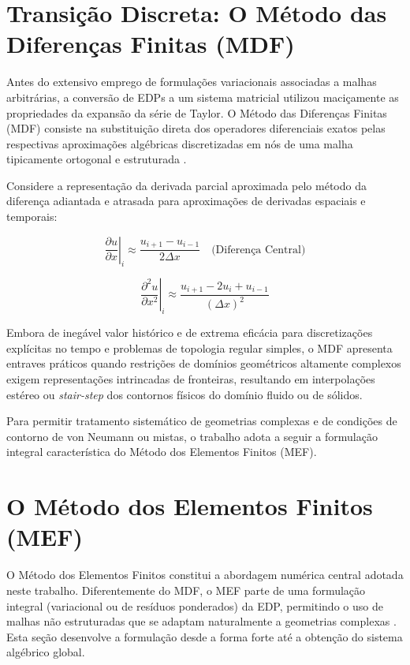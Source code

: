 \section{Transição Discreta: O Método das Diferenças Finitas (MDF)}
\label{sec:introducao_mdf}

Antes do extensivo emprego de formulações variacionais associadas a malhas arbitrárias, a conversão de EDPs a um sistema matricial utilizou maciçamente as propriedades da expansão da série de Taylor. O Método das Diferenças Finitas (MDF) consiste na substituição direta dos operadores diferenciais exatos pelas respectivas aproximações algébricas discretizadas em nós de uma malha tipicamente ortogonal e estruturada \cite{Anjos2024}.

Considere a representação da derivada parcial aproximada pelo método da diferença adiantada e atrasada para aproximações de derivadas espaciais e temporais:

\begin{equation}
\left. \frac{\partial u}{\partial x} \right|_{i} \approx \frac{u_{i+1} - u_{i-1}}{2\Delta x} \quad \text{(Diferença Central)}
\label{eq:mdf_primeira_derivada}
\end{equation}

\begin{equation}
\left. \frac{\partial^2 u}{\partial x^2} \right|_{i} \approx \frac{u_{i+1} - 2u_i + u_{i-1}}{(\Delta x)^2}
\label{eq:mdf_segunda_derivada}
\end{equation}

Embora de inegável valor histórico e de extrema eficácia para discretizações explícitas no tempo e problemas de topologia regular simples, o MDF apresenta entraves práticos quando restrições de domínios geométricos altamente complexos exigem representações intrincadas de fronteiras, resultando em interpolações estéreo ou \textit{stair-step} dos contornos físicos do domínio fluido ou de sólidos.

Para permitir tratamento sistemático de geometrias complexas e de condições de contorno de von Neumann ou mistas, o trabalho adota a seguir a formulação integral característica do Método dos Elementos Finitos (MEF).

\section{O Método dos Elementos Finitos (MEF)}
\label{sec:mef}

O Método dos Elementos Finitos constitui a abordagem numérica central adotada neste trabalho. Diferentemente do MDF, o MEF parte de uma formulação integral (variacional ou de resíduos ponderados) da EDP, permitindo o uso de malhas não estruturadas que se adaptam naturalmente a geometrias complexas \cite{Zienkiewicz2013}. Esta seção desenvolve a formulação desde a forma forte até a obtenção do sistema algébrico global.

